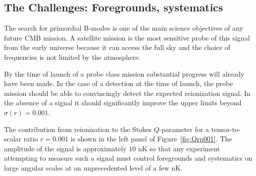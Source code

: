 \subsection{The Challenges: Foregrounds, systematics}
\label{sec:foregrounds}
\vspace{-0.05in}


The search for primordial B-modes is one of the main science objectives of any future CMB mission. A satellite mission is the most sensitive probe of this signal from the early universe because it can access the full sky and the choice of frequencies is not limited by the atmosphere. 

By the time of launch of a probe class mission substantial progress will already have been made. In the case of a detection at the time of launch, the probe mission should be able to convincingly detect the expected reionization signal. In the absence of a signal it should significantly improve the upper limits beyond $\sigma(r)=0.001$. 

The contribution from reionization to the Stokes $Q$-parameter for a tensor-to-scalar ratio $r=0.001$ is shown in the left panel of Figure~\ref{fig:Qrp001}. The amplitude of the signal is approximately $10$ nK so that any experiment attempting to measure such a signal must control foregrounds and systematics on large angular scales at an unprecedented level of a few nK. 

